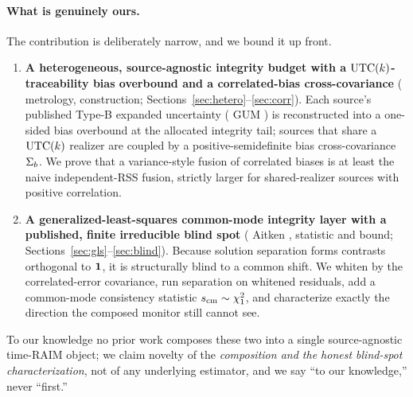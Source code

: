 \paragraph{What is genuinely ours.}
The contribution is deliberately narrow, and we bound it up front.
\begin{enumerate}
  \item \textbf{A heterogeneous, source-agnostic integrity budget with a
  $\mathrm{UTC}(k){}$-traceability bias overbound and a correlated-bias cross-covariance}
  (\Cited{} metrology, \Proven{} construction; Sections~\ref{sec:hetero}--\ref{sec:corr}).
  Each source's published Type-B expanded uncertainty (\Cited{} GUM
  \citep{jcgm100}) is reconstructed into a one-sided bias overbound at the allocated
  integrity tail; sources that share a $\mathrm{UTC}(k){}$ realizer are coupled by a
  positive-semidefinite bias cross-covariance $\Sigma_{b}{}$. We prove that a
  variance-style fusion of correlated biases is at least the naive independent-RSS
  fusion, strictly larger for shared-realizer sources with positive correlation.
  \item \textbf{A generalized-least-squares common-mode integrity layer with a
  published, finite irreducible blind spot} (\Cited{} Aitken \citep{aitken1935},
  \Proven{} statistic and bound; Sections~\ref{sec:gls}--\ref{sec:blind}). Because
  solution separation forms contrasts orthogonal to $\bm 1{}$, it is structurally
  blind to a common shift. We whiten by the correlated-error covariance, run
  separation on whitened residuals, add a common-mode consistency statistic
  $s_{\mathrm{cm}}{}\sim\chi^2_1$, and characterize exactly the direction the composed monitor
  still cannot see.
\end{enumerate}
To our knowledge no prior work composes these two into a single source-agnostic
time-RAIM object; we claim novelty of the \emph{composition and the honest
blind-spot characterization}, not of any underlying estimator, and we say ``to our
knowledge,'' never ``first.''

